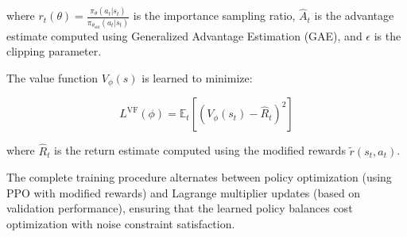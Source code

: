 where $r_t(\theta) = \frac{\pi_\theta(a_t|s_t)}{\pi_{\theta_{\text{old}}}(a_t|s_t)}$ is the importance sampling ratio, $\hat{A}_t$ is the advantage estimate computed using Generalized Advantage Estimation (GAE), and $\epsilon$ is the clipping parameter.

The value function $V_\phi(s)$ is learned to minimize:

\begin{equation}
L^{\text{VF}}(\phi) = \mathbb{E}_t \left[ \left( V_\phi(s_t) - \hat{R}_t \right)^2 \right]
\label{eq:value-loss}
\tag{14}
\end{equation}

where $\hat{R}_t$ is the return estimate computed using the modified rewards $\tilde{r}(s_t, a_t)$.

The complete training procedure alternates between policy optimization (using PPO with modified rewards) and Lagrange multiplier updates (based on validation performance), ensuring that the learned policy balances cost optimization with noise constraint satisfaction.

